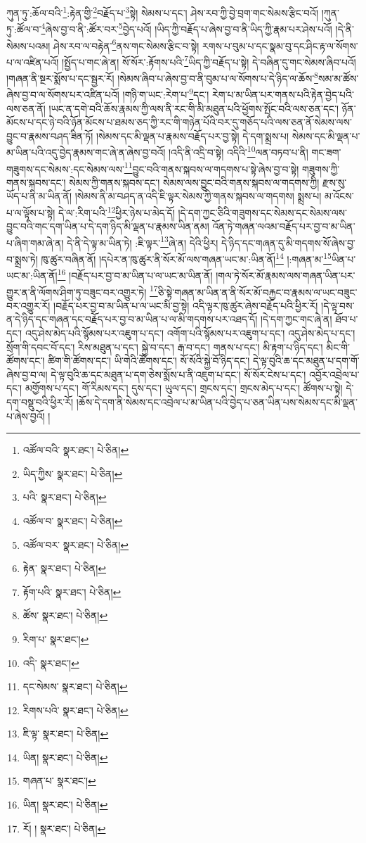 ཀུན་ཏུ་:ཆོལ་བའི་\footnote{འཚོལ་བའི་  སྣར་ཐང་།  པེ་ཅིན། }:རྟེན་གྱི་\footnote{ཡིད་ཀྱིས་  སྣར་ཐང་།  པེ་ཅིན། }བརྗོད་པ་\footnote{པའི་  སྣར་ཐང་།  པེ་ཅིན། }སྟེ། སེམས་པ་དང་། ཤེས་རབ་ཀྱི་བྱེ་བྲག་གང་སེམས་རྩིང་བའོ། །ཀུན་ཏུ་:ཚོལ་བ་\footnote{འཚོལ་བ་  སྣར་ཐང་།  པེ་ཅིན། }ཞེས་བྱ་བ་ནི་:ཚོར་བར་\footnote{འཚོལ་བར་  སྣར་ཐང་།  པེ་ཅིན། }བྱེད་པའོ། །ཡིད་ཀྱི་བརྗོད་པ་ཞེས་བྱ་བ་ནི་ཡིད་ཀྱི་རྣམ་པར་ཤེས་པའོ། །དེ་ནི་སེམས་པའམ། ཤེས་རབ་ལ་བརྟེན་\footnote{རྟེན་  སྣར་ཐང་།  པེ་ཅིན། }ནས་གང་སེམས་རྩིང་བ་སྟེ། རགས་པ་བུམ་པ་དང་སྣམ་བུ་དང་ཤིང་རྟ་ལ་སོགས་པ་ལ་འཛིན་པའོ། །སྤྱོད་པ་གང་ཞེ་ན། སོ་སོར་:རྟོགས་པའི་\footnote{རྟོག་པའི་  སྣར་ཐང་།  པེ་ཅིན། }ཡིད་ཀྱི་བརྗོད་པ་སྟེ། དེ་བཞིན་དུ་གང་སེམས་ཞིབ་པའོ། །གཞན་ནི་སྔར་སྨོས་པ་དང་སྦྱར་རོ། །སེམས་ཞིབ་པ་ཞེས་བྱ་བ་ནི་བུམ་པ་ལ་སོགས་པ་དེ་ཉིད་ལ་ཆོས་\footnote{ཚོས་  སྣར་ཐང་།  པེ་ཅིན། }སམ་མ་ཚོས་ཞེས་བྱ་བ་ལ་སོགས་པར་འཛིན་པའོ། །གཉི་ག་ཡང་:རེག་པ་\footnote{རིག་པ་  སྣར་ཐང་། }དང་། རེག་པ་མ་ཡིན་པར་གནས་པའི་རྟེན་བྱེད་པའི་ལས་ཅན་ནོ། །ཡང་ན་དགེ་བའི་ཆོས་རྣམས་ཀྱི་ལས་ནི་རང་གི་མི་མཐུན་པའི་ཕྱོགས་སྤོང་བའི་ལས་ཅན་དང་། ཉོན་མོངས་པ་དང་ཉེ་བའི་ཉོན་མོངས་པ་ཐམས་ཅད་ཀྱི་རང་གི་གཉེན་པོའི་བར་དུ་གཅོད་པའི་ལས་ཅན་ནོ་སེམས་ལས་བྱུང་བ་རྣམས་བཤད་ཟིན་ཏོ། །སེམས་དང་མི་ལྡན་པ་རྣམས་བརྗོད་པར་བྱ་སྟེ། དེ་དག་སྨྲས་པ། སེམས་དང་མི་ལྡན་པ་མ་ཡིན་པའི་འདུ་བྱེད་རྣམས་གང་ཞེ་ན་ཞེས་བྱ་བའོ། །འདི་ནི་འདྲི་བ་སྟེ། འདིའི་\footnote{འདི་  སྣར་ཐང་། }ལན་བཏབ་པ་ནི། གང་ཟག་གཟུགས་དང་སེམས་:དང་སེམས་ལས་\footnote{དང་སེམས་  སྣར་ཐང་།  པེ་ཅིན། }བྱུང་བའི་གནས་སྐབས་ལ་གདགས་པ་སྟེ་ཞེས་བྱ་བ་སྟེ། གཟུགས་ཀྱི་གནས་སྐབས་དང་། སེམས་ཀྱི་གནས་སྐབས་དང་། སེམས་ལས་བྱུང་བའི་གནས་སྐབས་ལ་གདགས་ཀྱི། རྫས་སུ་ཡོད་པ་ནི་མ་ཡིན་ནོ། །སེམས་ནི་མ་བཤད་ན་འདི་ཇི་ལྟར་སེམས་ཀྱི་གནས་སྐབས་ལ་གདགས། སྨྲས་པ། མ་འོངས་པ་ལ་ལྟོས་པ་སྟེ། དེ་ལ་:རིག་པའི་\footnote{རིགས་པའི་  སྣར་ཐང་།  པེ་ཅིན། }ཕྱིར་ཉེས་པ་མེད་དོ། །དེ་དག་ཀྱང་ཅིའི་གཟུགས་དང་སེམས་དང་སེམས་ལས་བྱུང་བའི་གང་དག་ཡིན་པ་དེ་དག་ཉིད་མི་ལྡན་པ་རྣམས་ཡིན་ནམ། འོན་ཏེ་གཞན་ལའམ་བརྗོད་པར་བྱ་བ་མ་ཡིན་པ་ཞིག་གམ་ཞེ་ན། དེ་ནི་དེ་ལྟ་མ་ཡིན་ཏེ། :ཇི་ལྟར་\footnote{ཇི་ལྟ་  སྣར་ཐང་།  པེ་ཅིན། }ཞེ་ན། དེའི་ཕྱིར། དེ་ཉིད་དང་གཞན་དུ་མི་གདགས་སོ་ཞེས་བྱ་བ་སྨྲས་ཏེ། ཁུ་ཚུར་བཞིན་ནོ། །དཔེར་ན་ཁུ་ཚུར་ནི་སོར་མོ་ལས་གཞན་ཡང་མ་:ཡིན་ནོ།\footnote{ཡིན།  སྣར་ཐང་།  པེ་ཅིན། } །:གཞན་མ་\footnote{གཞན་པ་  སྣར་ཐང་། }ཡིན་པ་ཡང་མ་:ཡིན་ནོ།\footnote{ཡིན།  སྣར་ཐང་།  པེ་ཅིན། } །བརྗོད་པར་བྱ་བ་མ་ཡིན་པ་ལ་ཡང་མ་ཡིན་ནོ། །གལ་ཏེ་སོར་མོ་རྣམས་ལས་གཞན་ཡིན་པར་གྱུར་ན་ནི་ལོགས་ཤིག་ཏུ་བཟུང་བར་འགྱུར་ཏེ། \footnote{རོ། །   སྣར་ཐང་།  པེ་ཅིན། }ཅི་སྟེ་གཞན་མ་ཡིན་ན་ནི་སོར་མོ་བརྐྱང་བ་རྣམས་ལ་ཡང་བཟུང་བར་འགྱུར་རོ། །བརྗོད་པར་བྱ་བ་མ་ཡིན་པ་ལ་ཡང་མི་བྱ་སྟེ། འདི་ལྟར་ཁུ་ཚུར་ཞེས་བརྗོད་པའི་ཕྱིར་རོ། །དེ་ལྟ་བས་ན་དེ་ཉིད་དང་གཞན་དང་བརྗོད་པར་བྱ་བ་མ་ཡིན་པ་ལ་མི་གདགས་པར་འཐད་དོ། །དེ་དག་ཀྱང་གང་ཞེ་ན། ཐོབ་པ་དང་། འདུ་ཤེས་མེད་པའི་སྙོམས་པར་འཇུག་པ་དང་། འགོག་པའི་སྙོམས་པར་འཇུག་པ་དང་། འདུ་ཤེས་མེད་པ་དང་། སྲོག་གི་དབང་བོ་དང་། རིས་མཐུན་པ་དང་། སྐྱེ་བ་དང་། རྒ་བ་དང་། གནས་པ་དང་། མི་རྟག་པ་ཉིད་དང་། མིང་གི་ཚོགས་དང་། ཚིག་གི་ཚོགས་དང་། ཡི་གེའི་ཚོགས་དང་། སོ་སོའི་སྐྱེ་བོ་ཉིད་དང་། དེ་ལྟ་བུའི་ཆ་དང་མཐུན་པ་དག་གོ་ཞེས་བྱ་བ་ལ། དེ་ལྟ་བུའི་ཆ་དང་མཐུན་པ་དག་ཅེས་སྨོས་པ་ནི་འཇུག་པ་དང་། སོ་སོར་ངེས་པ་དང་། འབྱོར་འབྲེལ་པ་དང་། མགྱོགས་པ་དང་། གོ་རིམས་དང་། དུས་དང་། ཡུལ་དང་། གྲངས་དང་། གྲངས་མེད་པ་དང་། ཚོགས་པ་སྟེ། དེ་དག་བསྡུ་བའི་ཕྱིར་རོ། །ཆོས་དེ་དག་ནི་སེམས་དང་འབྲེལ་པ་མ་ཡིན་པའི་བྱེད་པ་ཅན་ཡིན་པས་སེམས་དང་མི་ལྡན་པ་ཞེས་བྱའོ། །

